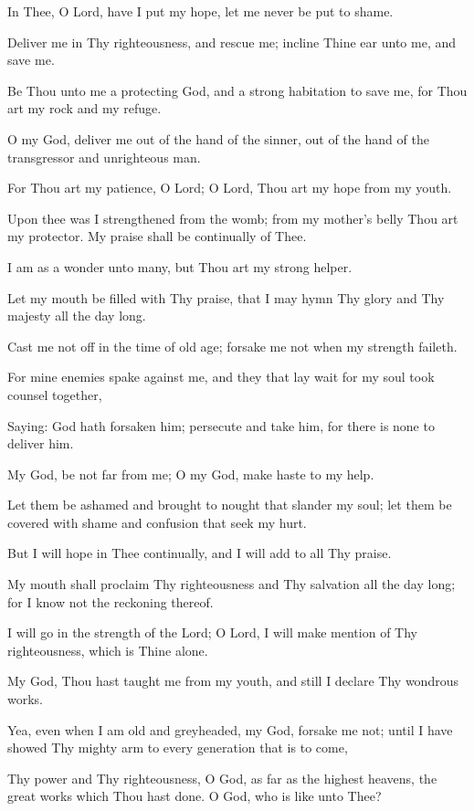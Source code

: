 In Thee, O Lord, have I put my hope, let me never be put to shame.

Deliver me in Thy righteousness, and rescue me; incline Thine ear unto me, and save me.

Be Thou unto me a protecting God, and a strong habitation to save me, for Thou art my rock and my refuge.

O my God, deliver me out of the hand of the sinner, out of the hand of the transgressor and unrighteous man.

For Thou art my patience, O Lord; O Lord, Thou art my hope from my youth.

Upon thee was I strengthened from the womb; from my mother's belly Thou art my protector. My praise shall be continually of Thee.

I am as a wonder unto many, but Thou art my strong helper.

Let my mouth be filled with Thy praise, that I may hymn Thy glory and Thy majesty all the day long.

Cast me not off in the time of old age; forsake me not when my strength faileth.

For mine enemies spake against me, and they that lay wait for my soul took counsel together,

Saying: God hath forsaken him; persecute and take him, for there is none to deliver him.

My God, be not far from me; O my God, make haste to my help.

Let them be ashamed and brought to nought that slander my soul; let them be covered with shame and confusion that seek my hurt.

But I will hope in Thee continually, and I will add to all Thy praise.

My mouth shall proclaim Thy righteousness and Thy salvation all the day long; for I know not the reckoning thereof.

I will go in the strength of the Lord; O Lord, I will make mention of Thy righteousness, which is Thine alone.

My God, Thou hast taught me from my youth, and still I declare Thy wondrous works.

Yea, even when I am old and greyheaded, my God, forsake me not; until I have showed Thy mighty arm to every generation that is to come,

Thy power and Thy righteousness, O God, as far as the highest heavens, the great works which Thou hast done. O God, who is like unto Thee?


